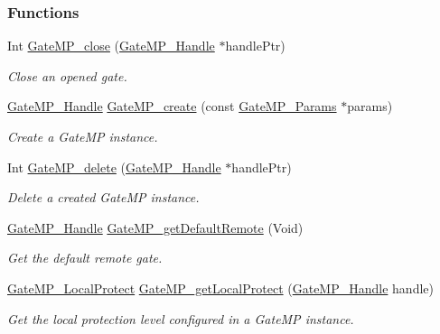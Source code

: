 \subsubsection*{Functions}
\begin{DoxyCompactItemize}
\item 
Int \hyperlink{_gate_m_p_8h_a0c64bfa32191b16de290787289e46481}{Gate\-M\-P\-\_\-close} (\hyperlink{_gate_m_p_8h_ad5bb259f928a14e98d973334bc60ebb3}{Gate\-M\-P\-\_\-\-Handle} $\ast$handle\-Ptr)
\begin{DoxyCompactList}\small\item\em Close an opened gate. \end{DoxyCompactList}\item 
\hyperlink{_gate_m_p_8h_ad5bb259f928a14e98d973334bc60ebb3}{Gate\-M\-P\-\_\-\-Handle} \hyperlink{_gate_m_p_8h_ad83d284487eb5d7996318c7e8d88cf82}{Gate\-M\-P\-\_\-create} (const \hyperlink{struct_gate_m_p___params}{Gate\-M\-P\-\_\-\-Params} $\ast$params)
\begin{DoxyCompactList}\small\item\em Create a Gate\-M\-P instance. \end{DoxyCompactList}\item 
Int \hyperlink{_gate_m_p_8h_aed5bd2b4543a937c82aba23f9458983c}{Gate\-M\-P\-\_\-delete} (\hyperlink{_gate_m_p_8h_ad5bb259f928a14e98d973334bc60ebb3}{Gate\-M\-P\-\_\-\-Handle} $\ast$handle\-Ptr)
\begin{DoxyCompactList}\small\item\em Delete a created Gate\-M\-P instance. \end{DoxyCompactList}\item 
\hyperlink{_gate_m_p_8h_ad5bb259f928a14e98d973334bc60ebb3}{Gate\-M\-P\-\_\-\-Handle} \hyperlink{_gate_m_p_8h_a6c09c820ed3852840f0ce3036a276687}{Gate\-M\-P\-\_\-get\-Default\-Remote} (Void)
\begin{DoxyCompactList}\small\item\em Get the default remote gate. \end{DoxyCompactList}\item 
\hyperlink{_gate_m_p_8h_a3877bd64627d7449d3687e8b06939652}{Gate\-M\-P\-\_\-\-Local\-Protect} \hyperlink{_gate_m_p_8h_ace72dca8b36d6bcb16d931463cdcece1}{Gate\-M\-P\-\_\-get\-Local\-Protect} (\hyperlink{_gate_m_p_8h_ad5bb259f928a14e98d973334bc60ebb3}{Gate\-M\-P\-\_\-\-Handle} handle)
\begin{DoxyCompactList}\small\item\em Get the local protection level configured in a Gate\-M\-P instance. \end{DoxyCompactList}\item 

\end{DoxyCompactItemize}
